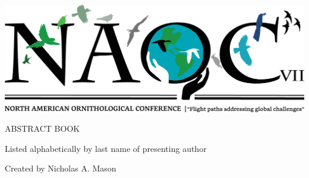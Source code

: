 \documentclass[twoside]{article}
\begin{document}

\thispagestyle{empty}
\pagestyle{fancy}
\setlength{\parindent}{0cm}

\newcommand\normaltalk[3]{%
	\begin{samepage}
	\textbf{#1}
	
	\vspace{12pt}
	
	#2

	\vspace{12pt}
	\end{samepage}
	
        #3
	
	\begin{center}
        \noindent\rule{2cm}{0.4pt}	
        \end{center}
        
}




\vspace{20pt}
\begin{center}
    \includegraphics[width=\textwidth]{NAOC2020_logo_5.png}
    
    \vspace{20pt}
    
    \huge{ABSTRACT BOOK}
   
    \vspace{20pt}
    
    \huge{Listed alphabetically by last name of presenting author}
    
    \tableofcontents

\vspace*{\fill}

\normalsize
Created by Nicholas A. Mason
	
\end{center}
\end{document}
